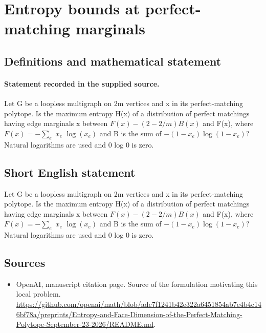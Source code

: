 \documentclass[11pt]{article}
\begin{document}
\section*{Entropy bounds at perfect-matching marginals}\label{statement}
\subsection{Definitions and mathematical statement}
\paragraph{Statement recorded in the supplied source.}
Let G be a loopless multigraph on 2m vertices and x in its perfect-matching polytope. Is the maximum entropy H(x) of a distribution of perfect matchings having edge marginals x between $F(x)-(2-2/m)B(x)$ and F(x), where $F(x)=-\sum _e$ $x_e$ $\log (x_e)$ and B is the sum of $-(1-x_e)\log (1-x_e)$? Natural logarithms are used and 0 log 0 is zero.
\subsection{Short English statement}
Let G be a loopless multigraph on 2m vertices and x in its perfect-matching polytope. Is the maximum entropy H(x) of a distribution of perfect matchings having edge marginals x between $F(x)-(2-2/m)B(x)$ and F(x), where $F(x)=-\sum _e$ $x_e$ $\log (x_e)$ and B is the sum of $-(1-x_e)\log (1-x_e)$? Natural logarithms are used and 0 log 0 is zero.
\subsection{Sources}
\begin{itemize}
\item[S1] OpenAI, manuscript citation page. Source of the formulation motivating this local problem.
\url{https://github.com/openai/math/blob/adc7f1241b42e322a6451854ab7e4b4c146bf78a/preprints/Entropy-and-Face-Dimension-of-the-Perfect-Matching-Polytope-September-23-2026/README.md}.
\end{itemize}
\end{document}
